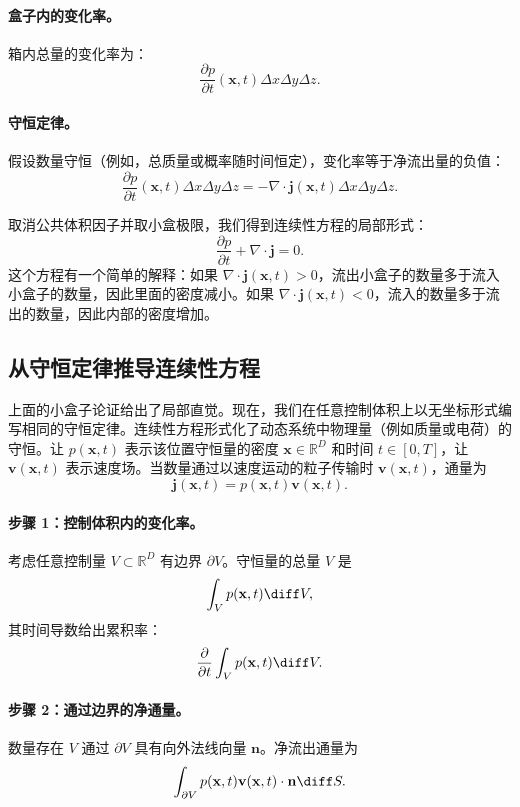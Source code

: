 \paragraph{盒子内的变化率。}
箱内总量的变化率为：
\[
\frac{\partial p}{\partial t}(\mathbf{x}, t) \Delta x \Delta y \Delta z.
\]

\paragraph{守恒定律。}
假设数量守恒（例如，总质量或概率随时间恒定），变化率等于净流出量的负值：
\[
\frac{\partial p}{\partial t}(\mathbf{x}, t) \Delta x \Delta y \Delta z = - \nabla \cdot \mathbf{j}(\mathbf{x}, t) \Delta x \Delta y \Delta z.
\]

取消公共体积因子并取小盒极限，我们得到连续性方程的局部形式：
\[
\frac{\partial p}{\partial t} + \nabla \cdot \mathbf{j} = 0.
\]
这个方程有一个简单的解释：如果 $\nabla\cdot\mathbf{j}(\mathbf{x},t)>0$，流出小盒子的数量多于流入小盒子的数量，因此里面的密度减小。如果 $\nabla\cdot\mathbf{j}(\mathbf{x},t)<0$，流入的数量多于流出的数量，因此内部的密度增加。


\subsection{从守恒定律推导连续性方程}

上面的小盒子论证给出了局部直觉。现在，我们在任意控制体积上以无坐标形式编写相同的守恒定律。连续性方程形式化了动态系统中物理量（例如质量或电荷）的守恒。让 $p(\mathbf{x}, t)$ 表示该位置守恒量的密度 $\mathbf{x} \in \mathbb{R}^D$ 和时间 $t \in [0, T]$，让 $\mathbf{v}(\mathbf{x}, t)$ 表示速度场。当数量通过以速度运动的粒子传输时 $\mathbf{v}(\mathbf{x},t)$，通量为
\[
\mathbf{j}(\mathbf{x},t)=p(\mathbf{x},t)\mathbf{v}(\mathbf{x},t).
\]

\paragraph{步骤 1：控制体积内的变化率。}
考虑任意控制量 $V \subset \mathbb{R}^D$ 有边界 $\partial V$。守恒量的总量 $V$ 是
\[
\int_V p(\mathbf{x}, t) \diff V,
\]
其时间导数给出累积率：
\[
\frac{\partial}{\partial t} \int_V p(\mathbf{x}, t) \diff V.
\]

\paragraph{步骤 2：通过边界的净通量。}
数量存在 $V$ 通过 $\partial V$ 具有向外法线向量 $\mathbf{n}$。净流出通量为
\[
\int_{\partial V} p(\mathbf{x}, t) \mathbf{v}(\mathbf{x}, t) \cdot \mathbf{n} \diff S.
\]

